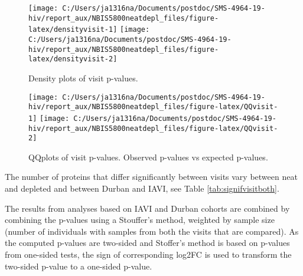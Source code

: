 \documentclass[
]{article}
\begin{document}
\begin{figure}
\texttt{[image: C:/Users/ja1316na/Documents/postdoc/SMS-4964-19-hiv/report\_aux/NBIS5800neatdepl\_files/figure-latex/densityvisit-1]} \texttt{[image: C:/Users/ja1316na/Documents/postdoc/SMS-4964-19-hiv/report\_aux/NBIS5800neatdepl\_files/figure-latex/densityvisit-2]} \caption{Density plots of visit p-values.}\label{fig:densityvisit}
\end{figure}

\begin{figure}
\texttt{[image: C:/Users/ja1316na/Documents/postdoc/SMS-4964-19-hiv/report\_aux/NBIS5800neatdepl\_files/figure-latex/QQvisit-1]} \texttt{[image: C:/Users/ja1316na/Documents/postdoc/SMS-4964-19-hiv/report\_aux/NBIS5800neatdepl\_files/figure-latex/QQvisit-2]} \caption{QQplots of visit p-values. Observed p-values vs expected p-values.}\label{fig:QQvisit}
\end{figure}

The number of proteins that differ significantly between visits vary between neat and depleted and between Durban and IAVI, see Table \ref{tab:signifvisitboth}.

The results from analyses based on IAVI and Durban cohorts are combined by combining the p-values using a Stouffer's method, weighted by sample size (number of individuals with samples from both the visits that are compared). As the computed p-values are two-sided and Stoffer's method is based on p-values from one-sided tests, the sign of corresponding log2FC is used to transform the two-sided p-value to a one-sided p-value.

\FloatBarrier
\end{document}
